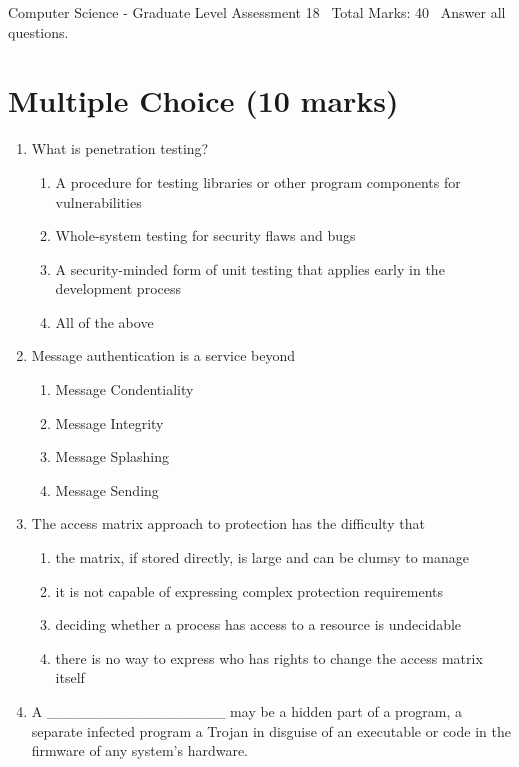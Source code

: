 \documentclass[12pt]{article}
\begin{document}
\begin{center}
Computer Science - Graduate Level Assessment 18 \
Total Marks: 40 \
Answer all questions.
\end{center}

\section*{Multiple Choice (10 marks)}
\begin{enumerate}[label=\arabic*.]
\item What is penetration testing?
\begin{enumerate}[label=(\alph*)]
    \item A procedure for testing libraries or other program components for vulnerabilities
    \item Whole-system testing for security flaws and bugs
    \item A security-minded form of unit testing that applies early in the development process
    \item All of the above
\end{enumerate}
\item Message authentication is a service beyond
\begin{enumerate}[label=(\alph*)]
    \item Message Condentiality
    \item Message Integrity
    \item Message Splashing
    \item Message Sending
\end{enumerate}
\item The access matrix approach to protection has the difficulty that
\begin{enumerate}[label=(\alph*)]
    \item the matrix, if stored directly, is large and can be clumsy to manage
    \item it is not capable of expressing complex protection requirements
    \item deciding whether a process has access to a resource is undecidable
    \item there is no way to express who has rights to change the access matrix itself
\end{enumerate}
\item A \_\_\_\_\_\_\_\_\_\_\_\_\_\_\_\_\_ may be a hidden part of a program, a separate infected program a Trojan in disguise of an executable or code in the firmware of any system's hardware.
\begin{enumerate}[label=(\alph*)]

\end{enumerate}
\end{enumerate}
\end{document}
